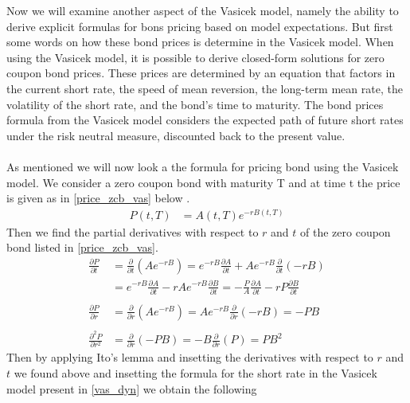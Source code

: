 Now we will examine another aspect of the Vasicek model, namely the ability to derive explicit formulas
for bons pricing based on model expectations.
But first some words on how these bond prices is determine in the Vasicek model. 
When using the Vasicek model, it is possible to derive closed-form solutions for zero coupon bond prices. 
These prices are determined by an equation that factors in the current short rate, the speed of mean reversion,
the long-term mean rate, the volatility of the short rate, and the bond’s time to maturity.
The bond prices formula from the Vasicek model considers the expected path of future short 
rates under the risk neutral measure, discounted back to the present value. 
\\\\
As mentioned we will now look a the formula for pricing bond using the Vasicek model. We consider a zero coupon bond
with maturity T and at time t the price is given as in \autoref{price_zcb_vas} below \cite{Bjork}.
\begin{align}
    P(t,T) &= A(t,T) e^{-rB(t,T)} 
    \label{price_zcb_vas} 
\end{align}
Then we find the partial derivatives with respect to $r$ and $t$ of the zero coupon bond listed in \autoref{price_zcb_vas}.
\begin{align*}
    \frac{\partial P}{\partial t} &= \frac{\partial}{\partial t} (Ae^{-rB}) 
    = e^{-rB} \frac{\partial A}{\partial t} + Ae^{-rB} \frac{\partial}{\partial t} (-rB) \\
    &= e^{-rB} \frac{\partial A}{\partial t} - rAe^{-rB} \frac{\partial B}{\partial t} = 
    - \frac{P}{A} \frac{\partial A}{\partial t} - rP \frac{\partial B}{\partial t}
    \\\\
    \frac{\partial P}{\partial r} &= \frac{\partial}{\partial r} (Ae^{-rB}) 
    = Ae^{-rB} \frac{\partial}{\partial r} (-rB) = -PB 
    \\\\
    \frac{\partial^2 P}{\partial r^2} &= \frac{\partial}{\partial r} (-PB) = -B \frac{\partial}{\partial r} (P) = PB^2
\end{align*}
Then by applying Ito's lemma \cite{Bjork} and insetting the derivatives with respect to $r$ and $t$ we found above and
insetting the formula for the short rate in the Vasicek model present in \autoref{vas_dyn} we obtain the following
